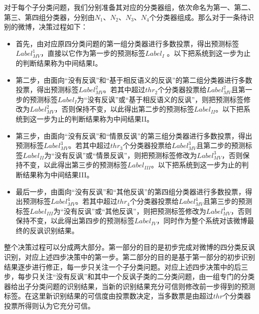 对于每个子分类问题，我们分别准备其对应的分类器组，依次命名为第一、第二、第三、第四组分类器，分别由$N_1$、$N_2$、$N_3$、$N_4$个分类器组成。那么对于一条待识别的微博，决策过程如下：

\begin{itemize}

\item 首先，由对应原四分类问题的第一组分类器进行多数投票，得出预测标签$Label^{1}_{MV}$，直接以它作为第一步的预测标签$Label_{I}$ 。以下把系统到这一步为止的判断结果称为中间结果I。

\item 第二步，由面向“没有反讽”和“基于相反语义的反讽”的第二组分类器进行多数投票，得出预测标签$Label^{2}_{MV}$。若其中超过$thr_{2}$个分类器投票给$Label^{2}_{MV}$且第一步的预测标签$Label_{I}$为“没有反讽”或“基于相反语义的反讽”，则把预测标签修改为$Label^{2}_{MV}$，否则保持不变，以此得出第二步的预测标签$Label_{II}$。以下把系统到这一步为止的判断结果称为中间结果II。

\item 第三步，由面向“没有反讽”和“情景反讽”的第三组分类器进行多数投票，得出预测标签$Label^{3}_{MV}$。若其中超过$thr_{3}$个分类器投票给$Label^{3}_{MV}$且第二步的预测标签$Label_{II}$为“没有反讽”或“情景反讽”，则把预测标签修改为$Label^{3}_{MV}$，否则保持不变，以此得出第三步的预测标签$Label_{III}$。以下把系统到这一步为止的判断结果称为中间结果III。

\item 最后一步，由面向“没有反讽”和“其他反讽”的第四组分类器进行多数投票，得出预测标签$Label^{4}_{MV}$。若其中超过$thr_{4}$个分类器投票给$Label^{4}_{MV}$且第三步的预测标签$Label_{III}$为“没有反讽”或“其他反讽”，则把预测标签修改为$Label^{4}_{MV}$，否则保持不变，以此得出第四步的预测标签$Label_{IV}$，同时作为整个系统对该微博最终的反讽识别结果。

\end{itemize}

整个决策过程可以分成两大部分。第一部分的目的是初步完成对微博的四分类反讽识别，对应上述四步决策中的第一步。第二部分的目的是基于第一部分的初步识别结果逐步进行修正，每一步只关注一个子分类问题。对应上述四步决策中的后三步，每步只关注“没有反讽”和其中一个反讽子类的二分类问题，由一组专门的分类器给出子分类问题的识别结果，当新的识别结果充分可信则修改前一步得到的预测标签。在这里新识别结果的可信度由投票数决定，当多数票是由超过$thr$个分类器投票所得则认为它充分可信。

